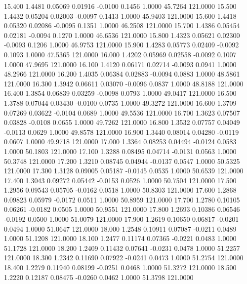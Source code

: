   15.400   1.4481   0.05069   0.01916  -0.0100   0.1456   1.0000  45.7264 121.0000
  15.500   1.4432   0.05204   0.02003  -0.0097   0.1413   1.0000  45.9403 121.0000
  15.600   1.4418   0.05320   0.02086  -0.0095   0.1351   1.0000  46.2508 121.0000
  15.700   1.4386   0.05454   0.02181  -0.0094   0.1270   1.0000  46.6536 121.0000
  15.800   1.4323   0.05621   0.02300  -0.0093   0.1206   1.0000  46.9753 121.0000
  15.900   1.4283   0.05773   0.02409  -0.0092   0.1093   1.0000  47.5365 121.0000
  16.000   1.4202   0.05969   0.02558  -0.0092   0.1007   1.0000  47.9695 121.0000
  16.100   1.4120   0.06171   0.02714  -0.0093   0.0941   1.0000  48.2966 121.0000
  16.200   1.4035   0.06384   0.02883  -0.0094   0.0883   1.0000  48.5861 121.0000
  16.300   1.3942   0.06611   0.03070  -0.0096   0.0837   1.0000  48.8188 121.0000
  16.400   1.3854   0.06839   0.03259  -0.0098   0.0793   1.0000  49.0417 121.0000
  16.500   1.3788   0.07044   0.03430  -0.0100   0.0735   1.0000  49.3272 121.0000
  16.600   1.3709   0.07269   0.03622  -0.0104   0.0689   1.0000  49.5536 121.0000
  16.700   1.3623   0.07507   0.03828  -0.0108   0.0655   1.0000  49.7262 121.0000
  16.800   1.3532   0.07757   0.04049  -0.0113   0.0629   1.0000  49.8578 121.0000
  16.900   1.3440   0.08014   0.04280  -0.0119   0.0607   1.0000  49.9718 121.0000
  17.000   1.3364   0.08253   0.04494  -0.0124   0.0583   1.0000  50.1803 121.0000
  17.100   1.3288   0.08495   0.04714  -0.0131   0.0563   1.0000  50.3748 121.0000
  17.200   1.3210   0.08745   0.04944  -0.0137   0.0547   1.0000  50.5325 121.0000
  17.300   1.3128   0.09005   0.05187  -0.0145   0.0535   1.0000  50.6539 121.0000
  17.400   1.3043   0.09272   0.05442  -0.0153   0.0526   1.0000  50.7504 121.0000
  17.500   1.2956   0.09543   0.05705  -0.0162   0.0518   1.0000  50.8303 121.0000
  17.600   1.2868   0.09823   0.05979  -0.0172   0.0511   1.0000  50.8959 121.0000
  17.700   1.2780   0.10105   0.06261  -0.0182   0.0505   1.0000  50.9551 121.0000
  17.800   1.2693   0.10386   0.06546  -0.0192   0.0500   1.0000  51.0079 121.0000
  17.900   1.2619   0.10650   0.06817  -0.0201   0.0494   1.0000  51.0647 121.0000
  18.000   1.2548   0.10911   0.07087  -0.0211   0.0489   1.0000  51.1208 121.0000
  18.100   1.2477   0.11174   0.07365  -0.0221   0.0483   1.0000  51.1728 121.0000
  18.200   1.2409   0.11432   0.07641  -0.0231   0.0478   1.0000  51.2257 121.0000
  18.300   1.2342   0.11690   0.07922  -0.0241   0.0473   1.0000  51.2754 121.0000
  18.400   1.2279   0.11940   0.08199  -0.0251   0.0468   1.0000  51.3272 121.0000
  18.500   1.2220   0.12187   0.08475  -0.0260   0.0462   1.0000  51.3798 121.0000
